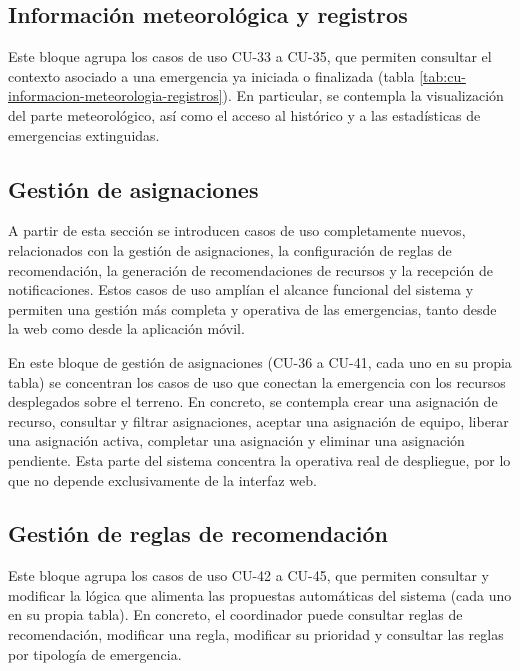 \subsection{Información meteorológica y registros}

Este bloque agrupa los casos de uso CU-33 a CU-35, que permiten consultar el contexto asociado a una emergencia ya iniciada o finalizada (tabla \ref{tab:cu-informacion-meteorologia-registros}). En particular, se contempla la visualización del parte meteorológico, así como el acceso al histórico y a las estadísticas de emergencias extinguidas.



\subsection{Gestión de asignaciones}

A partir de esta sección se introducen casos de uso completamente nuevos, relacionados con la gestión de asignaciones, la configuración de reglas de recomendación, la generación de recomendaciones de recursos y la recepción de notificaciones. Estos casos de uso amplían el alcance funcional del sistema y permiten una gestión más completa y operativa de las emergencias, tanto desde la web como desde la aplicación móvil.

En este bloque de gestión de asignaciones (CU-36 a CU-41, cada uno en su propia tabla) se concentran los casos de uso que conectan la emergencia con los recursos desplegados sobre el terreno. En concreto, se contempla crear una asignación de recurso, consultar y filtrar asignaciones, aceptar una asignación de equipo, liberar una asignación activa, completar una asignación y eliminar una asignación pendiente. Esta parte del sistema concentra la operativa real de despliegue, por lo que no depende exclusivamente de la interfaz web.




\subsection{Gestión de reglas de recomendación}

Este bloque agrupa los casos de uso CU-42 a CU-45, que permiten consultar y modificar la lógica que alimenta las propuestas automáticas del sistema (cada uno en su propia tabla). En concreto, el coordinador puede consultar reglas de recomendación, modificar una regla, modificar su prioridad y consultar las reglas por tipología de emergencia.

